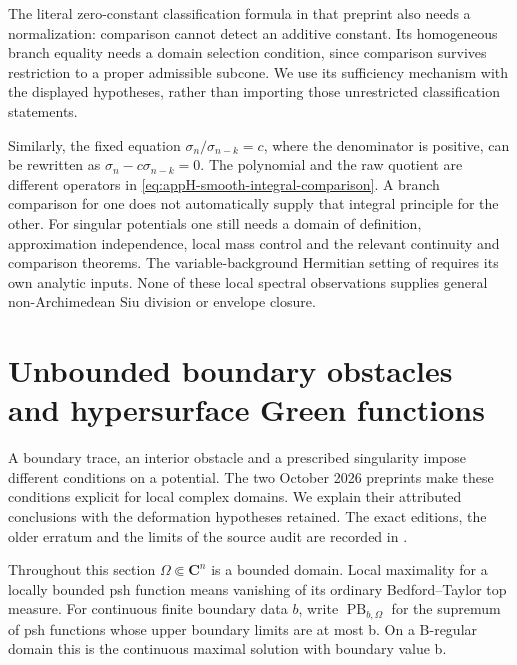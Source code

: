 The literal zero-constant classification formula in that preprint
also needs a normalization: comparison cannot detect an additive
constant. Its homogeneous branch equality needs a domain selection
condition, since comparison survives restriction to a proper
admissible subcone. We use its sufficiency mechanism with the
displayed hypotheses, rather than importing those unrestricted
classification statements.

Similarly, the fixed equation
\(\sigma_n/\sigma_{n-k}=c\), where the denominator is positive,
can be rewritten as \(\sigma_n-c\sigma_{n-k}=0\).
The polynomial and the raw quotient are different operators in
\eqref{eq:appH-smooth-integral-comparison}. A branch comparison
for one does not automatically supply that integral principle for
the other. For singular potentials one still needs a domain of
definition, approximation independence, local mass control and
the relevant continuity and comparison theorems. The variable-background
Hermitian setting of 
requires its own analytic inputs. None of these local spectral
observations supplies general non-Archimedean Siu division or
envelope closure.

\section{Unbounded boundary obstacles and hypersurface Green functions}
\label{sec:appH-boundary-envelopes}

A boundary trace, an interior obstacle and a prescribed singularity impose
different conditions on a potential. The two October 2026 preprints
\cite{DaoNguyen26UnboundedDirichletV1,DaoNguyenTran26HypersurfaceGreenV1}
make these conditions explicit for local complex domains. We explain their
attributed conclusions with the deformation hypotheses retained. The exact
editions, the older erratum and the limits of the source audit are recorded
in .

Throughout this section \(\Omega\Subset\mathbf C^n\) is a bounded domain.
Local maximality for a locally bounded psh function means vanishing of its
ordinary Bedford--Taylor top measure. For continuous finite boundary data
\(b\), write \(\operatorname{PB}_{b,\Omega}\) for the supremum of psh
functions whose upper boundary limits are at most b. On a B-regular domain
this is the continuous maximal solution with boundary value b.

